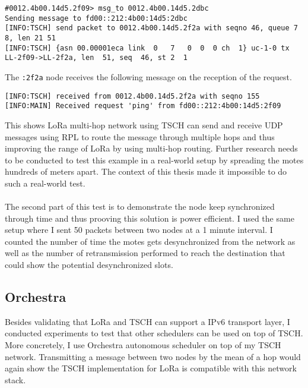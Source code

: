 \begin{lstlisting}[language=none]
#0012.4b00.14d5.2f09> msg_to 0012.4b00.14d5.2dbc
Sending message to fd00::212:4b00:14d5:2dbc
[INFO:TSCH] send packet to 0012.4b00.14d5.2f2a with seqno 46, queue 7 8, len 21 51
[INFO:TSCH] {asn 00.00001eca link  0   7   0  0  0 ch  1} uc-1-0 tx LL-2f09->LL-2f2a, len  51, seq  46, st 2  1
\end{lstlisting}

The \lstinline{:2f2a} node receives the following message on the reception of the
request.

\begin{lstlisting}[language=none]
[INFO:TSCH] received from 0012.4b00.14d5.2f2a with seqno 155
[INFO:MAIN] Received request 'ping' from fd00::212:4b00:14d5:2f09
\end{lstlisting}

This shows LoRa multi-hop network using TSCH can send and receive UDP messages
using RPL to route the message through multiple hops and thus improving the
range of LoRa by using multi-hop routing.
Further research needs to be conducted to test this example in a real-world
setup by spreading the motes hundreds of meters apart.
The context of this thesis made it impossible to do such a real-world test.

\paragraph{}

The second part of this test is to demonstrate the node keep synchronized
through time and thus prooving this solution is power efficient.
I used the same setup where I sent 50 packets between two nodes at a 1 minute
interval. I counted the number of time the motes gets desynchronized from the
network as well as the number of retransmission performed to reach the
destination that could show the potential desynchronized slots.

\subsection{Orchestra\label{section:tschorchestra}}

Besides validating that LoRa and TSCH can support a IPv6 transport
layer, I conducted experiments to test that other schedulers can be used on top
of TSCH. More concretely, I use Orchestra autonomous scheduler on top of my TSCH network.
Transmitting a message between two nodes by the mean of a hop would again show
the TSCH implementation for LoRa is compatible with this network stack.

